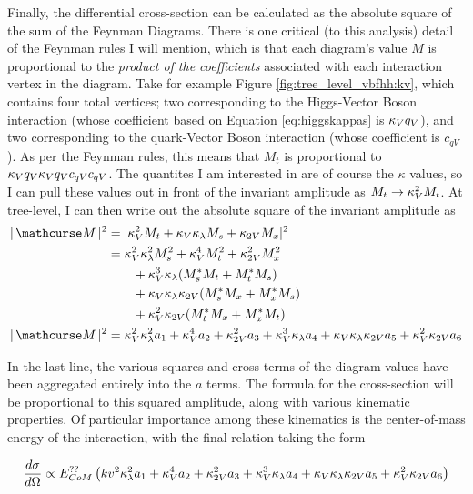     Finally, the differential cross-section can be calculated as the absolute square of the sum of the Feynman Diagrams.
    There is one critical (to this analysis) detail of the Feynman rules I will mention,
        which is that each diagram's value $M$ is proportional to the \textit{product of the coefficients}
        associated with each interaction vertex in the diagram.
    Take for example Figure \ref{fig:tree_level_vbfhh:kv}, which contains four total vertices;
        two corresponding to the Higgs-Vector Boson interaction (whose coefficient based on Equation \ref{eq:higgskappas} is $\kappa_{V} q_V$),
        and two corresponding to the quark-Vector Boson interaction (whose coefficient is $c_{qV}$).
    As per the Feynman rules, this means that $M_t$ is proportional to $\kappa_{V} q_V \kappa_{V} q_V c_{qV} c_{qV}$.
    The quantites I am interested in are of course the $\kappa$ values,
        so I can pull these values out in front of the invariant amplitude as $M_t \rightarrow \kappa_{V}^2 M_t$.
    At tree-level, I can then write out the absolute square of the invariant amplitude as
    \begin{equation} \begin{split}
        |\invAmp|^2 &= |  \kv^2 M_t + \kv \kl M_s + \kvv M_x |^2
        \\&= \kv^2 \kl^2 M_s^2 + \kv^4 M_t^2 + \kvv^2 M_x^2 
            \\&\qquad + \kv^3 \kl (M_s^* M_t + M_t^* M_s) 
            \\&\qquad + \kv \kl \kvv (M_s^* M_x + M_x^* M_s ) 
            \\&\qquad + \kv^2 \kvv (M_t^* M_x + M_x^* M_t )
        \\|\invAmp|^2 &= \kv^2 \kl^2 a_1 + \kv^4 a_2 + \kvv^2 a_3 + \kv^3 \kl a_4 + \kv \kl \kvv a_5 + \kv^2 \kvv a_6
    \end{split} \end{equation}

    In the last line, the various squares and cross-terms of the diagram values have been aggregated entirely into the $a$ terms.
    The formula for the cross-section will be proportional to this squared amplitude, along with various kinematic properties.
    Of particular importance among these kinematics is the center-of-mass energy of the interaction, with the final relation taking the form

    \begin{equation} \label{eq:dXsec_final} %
        \dXsec \propto E_{CoM}^{??}\left(kv^2 \kl^2 a_1 + \kv^4 a_2 + \kvv^2 a_3 + \kv^3 \kl a_4 + \kv \kl \kvv a_5 + \kv^2 \kvv a_6 \right)
    \end{equation}

